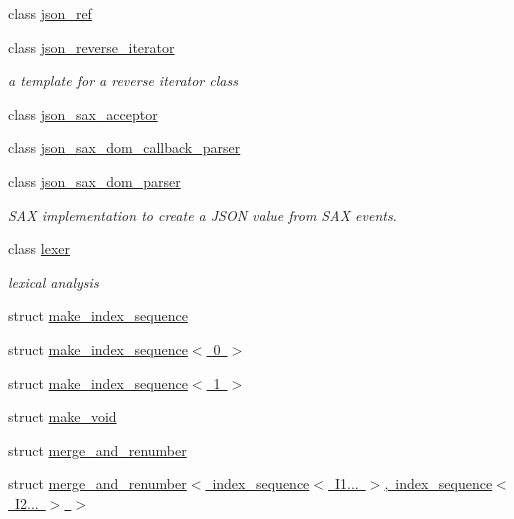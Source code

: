 \begin{DoxyCompactItemize}
\item 
class \mbox{\hyperlink{classnlohmann_1_1detail_1_1json__ref}{json\+\_\+ref}}
\item 
class \mbox{\hyperlink{classnlohmann_1_1detail_1_1json__reverse__iterator}{json\+\_\+reverse\+\_\+iterator}}
\begin{DoxyCompactList}\small\item\em a template for a reverse iterator class \end{DoxyCompactList}\item 
class \mbox{\hyperlink{classnlohmann_1_1detail_1_1json__sax__acceptor}{json\+\_\+sax\+\_\+acceptor}}
\item 
class \mbox{\hyperlink{classnlohmann_1_1detail_1_1json__sax__dom__callback__parser}{json\+\_\+sax\+\_\+dom\+\_\+callback\+\_\+parser}}
\item 
class \mbox{\hyperlink{classnlohmann_1_1detail_1_1json__sax__dom__parser}{json\+\_\+sax\+\_\+dom\+\_\+parser}}
\begin{DoxyCompactList}\small\item\em S\+AX implementation to create a J\+S\+ON value from S\+AX events. \end{DoxyCompactList}\item 
class \mbox{\hyperlink{classnlohmann_1_1detail_1_1lexer}{lexer}}
\begin{DoxyCompactList}\small\item\em lexical analysis \end{DoxyCompactList}\item 
struct \mbox{\hyperlink{structnlohmann_1_1detail_1_1make__index__sequence}{make\+\_\+index\+\_\+sequence}}
\item 
struct \mbox{\hyperlink{structnlohmann_1_1detail_1_1make__index__sequence_3_010_01_4}{make\+\_\+index\+\_\+sequence$<$ 0 $>$}}
\item 
struct \mbox{\hyperlink{structnlohmann_1_1detail_1_1make__index__sequence_3_011_01_4}{make\+\_\+index\+\_\+sequence$<$ 1 $>$}}
\item 
struct \mbox{\hyperlink{structnlohmann_1_1detail_1_1make__void}{make\+\_\+void}}
\item 
struct \mbox{\hyperlink{structnlohmann_1_1detail_1_1merge__and__renumber}{merge\+\_\+and\+\_\+renumber}}
\item 
struct \mbox{\hyperlink{structnlohmann_1_1detail_1_1merge__and__renumber_3_01index__sequence_3_01_i1_8_8_8_01_4_00_01indf5ec8c9c7b5107e4b381e3ca4c1be2ca}{merge\+\_\+and\+\_\+renumber$<$ index\+\_\+sequence$<$ I1... $>$, index\+\_\+sequence$<$ I2... $>$ $>$}}

\end{DoxyCompactItemize}
